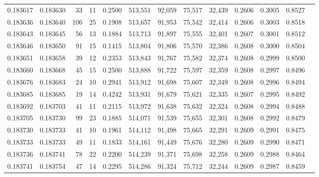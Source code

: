 \begin{tabular}{rrrrrrrrrrrrr}
0.183617 & 0.183630 &    33 &  11 &                                     0.2500 & 513,551 &  92,059 &  75,517 &  32,439 & 0.2606 & 0.3005 & 0.8527 \\
0.183636 & 0.183640 &   106 &  25 &                                     0.1908 & 513,657 &  91,953 &  75,542 &  32,414 & 0.2606 & 0.3003 & 0.8518 \\
0.183643 & 0.183645 &    56 &  13 &                                     0.1884 & 513,713 &  91,897 &  75,555 &  32,401 & 0.2607 & 0.3001 & 0.8512 \\
0.183646 & 0.183650 &    91 &  15 &                                     0.1415 & 513,804 &  91,806 &  75,570 &  32,386 & 0.2608 & 0.3000 & 0.8504 \\
0.183651 & 0.183658 &    39 &  12 &                                     0.2353 & 513,843 &  91,767 &  75,582 &  32,374 & 0.2608 & 0.2999 & 0.8500 \\
0.183660 & 0.183668 &    45 &  15 &                                     0.2500 & 513,888 &  91,722 &  75,597 &  32,359 & 0.2608 & 0.2997 & 0.8496 \\
0.183676 & 0.183683 &    24 &  10 &                                     0.2941 & 513,912 &  91,698 &  75,607 &  32,349 & 0.2608 & 0.2996 & 0.8494 \\
0.183685 & 0.183685 &    19 &  14 &                                     0.4242 & 513,931 &  91,679 &  75,621 &  32,335 & 0.2607 & 0.2995 & 0.8492 \\
0.183692 & 0.183703 &    41 &  11 &                                     0.2115 & 513,972 &  91,638 &  75,632 &  32,324 & 0.2608 & 0.2994 & 0.8488 \\
0.183705 & 0.183730 &    99 &  23 &                                     0.1885 & 514,071 &  91,539 &  75,655 &  32,301 & 0.2608 & 0.2992 & 0.8479 \\
0.183730 & 0.183733 &    41 &  10 &                                     0.1961 & 514,112 &  91,498 &  75,665 &  32,291 & 0.2609 & 0.2991 & 0.8475 \\
0.183733 & 0.183733 &    49 &  11 &                                     0.1833 & 514,161 &  91,449 &  75,676 &  32,280 & 0.2609 & 0.2990 & 0.8471 \\
0.183736 & 0.183741 &    78 &  22 &                                     0.2200 & 514,239 &  91,371 &  75,698 &  32,258 & 0.2609 & 0.2988 & 0.8464 \\
0.183741 & 0.183754 &    47 &  14 &                                     0.2295 & 514,286 &  91,324 &  75,712 &  32,244 & 0.2609 & 0.2987 & 0.8459 \\

\end{tabular}

